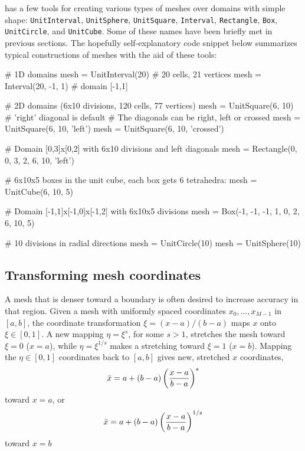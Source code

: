 \dolfin{} has a few tools for creating various types of meshes over
domains with simple
shape:
{\fontsize{10pt}{10pt}\texttt{UnitInterval}},
{\fontsize{10pt}{10pt}\texttt{UnitSphere}},
{\fontsize{10pt}{10pt}\texttt{UnitSquare}},
{\fontsize{10pt}{10pt}\texttt{Interval}},
{\fontsize{10pt}{10pt}\texttt{Rectangle}},
{\fontsize{10pt}{10pt}\texttt{Box}},
{\fontsize{10pt}{10pt}\texttt{UnitCircle}},
and
{\fontsize{10pt}{10pt}\texttt{UnitCube}}.
Some of these names have been briefly met in previous sections.
The hopefully self-explanatory code snippet below summarizes 
typical constructions of meshes with the aid of these tools:
\begin{python}
# 1D domains
mesh = UnitInterval(20)     # 20 cells, 21 vertices
mesh = Interval(20, -1, 1)  # domain [-1,1]

# 2D domains (6x10 divisions, 120 cells, 77 vertices)
mesh = UnitSquare(6, 10)  # 'right' diagonal is default
# The diagonals can be right, left or crossed
mesh = UnitSquare(6, 10, 'left')
mesh = UnitSquare(6, 10, 'crossed')

# Domain [0,3]x[0,2] with 6x10 divisions and left diagonals
mesh = Rectangle(0, 0, 3, 2, 6, 10, 'left')

# 6x10x5 boxes in the unit cube, each box gets 6 tetrahedra:
mesh = UnitCube(6, 10, 5)

# Domain [-1,1]x[-1,0]x[-1,2] with 6x10x5 divisions
mesh = Box(-1, -1, -1, 1, 0, 2, 6, 10, 5)

# 10 divisions in radial directions
mesh = UnitCircle(10)  
mesh = UnitSphere(10)
\end{python}

\subsection{Transforming mesh coordinates}
\label{langtangen:mesh:transform:cyl}

A mesh that is denser toward a boundary is often desired to increase
accuracy in that region. Given a mesh with uniformly spaced
coordinates $x_0,\ldots,x_{M-1}$ in $[a,b]$, the coordinate transformation
$\xi = (x-a)/(b-a)$ maps $x$ onto $\xi\in [0,1]$. A new mapping
$\eta = \xi^s$, for some $s>1$, stretches the mesh toward $\xi=0$ ($x=a$),
while $\eta = \xi^{1/s}$ makes a stretching toward $\xi=1$ ($x=b$).
Mapping the $\eta\in[0,1]$ coordinates back to $[a,b]$ gives new,
stretched $x$ coordinates,
\begin{equation} 
\bar x = a + (b-a)\left({x-a\over b-a}\right)^s
\end{equation}
toward $x=a$, or
\begin{equation} 
\bar x = a + (b-a)\left({x-a\over b-a}\right)^{1/s}
\end{equation}
toward $x=b$

